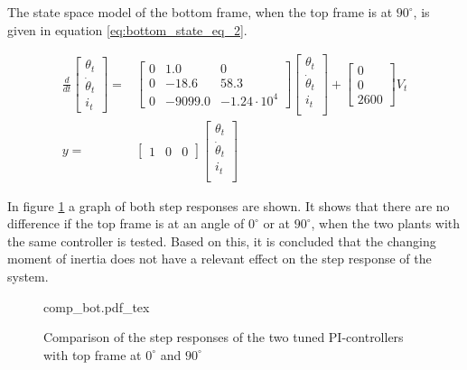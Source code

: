 \documentclass[../../../Main]{subfiles}
\begin{document}
The state space model of the bottom frame, when the top frame is at $90^\circ$, is given in equation \eqref{eq:bottom_state_eq_2}.

\begin{equation}
      \label{eq:bottom_state_eq_2}
      \begin{split}
      \frac{d}{dt}
    \begin{bmatrix}
        \theta_t \\
        \dot \theta_t \\
        i_t
    \end{bmatrix}
    =&
    \begin{bmatrix}0 & 1.0 & 0\\ 0 & -18.6 & 58.3\\ 0 & -9099.0 & -1.24\cdot10^4\end{bmatrix}
    \begin{bmatrix}
        \theta_t \\
        \dot \theta_t \\
        i_t \\
    \end{bmatrix}
    +
    \begin{bmatrix}
      0\\ 0\\ 2600
    \end{bmatrix}
    V_t
\\
      y =&
    \begin{bmatrix}
        1 & 0 & 0
    \end{bmatrix}
    \begin{bmatrix}
        \theta_t \\
        \dot \theta_t\\
        i_t\\
    \end{bmatrix}
    \end{split}
\end{equation}



In figure \ref{fig:comp_bot} a graph of both step responses are shown. It shows that there are no difference if the top frame is at an angle of $0^\circ$ or at $90^\circ$, when the two plants with the same controller is tested. Based on this, it is concluded that the changing moment of inertia does not have a relevant effect on the step response of the system.


\begin{figure}[H]
\centering
\def\svgwidth{\textwidth}
{comp_bot.pdf_tex}
\caption{Comparison of the step responses of the two tuned PI-controllers with top frame at $0^\circ$ and $90^\circ$}
\label{fig:comp_bot}
\end{figure}
\end{document}
